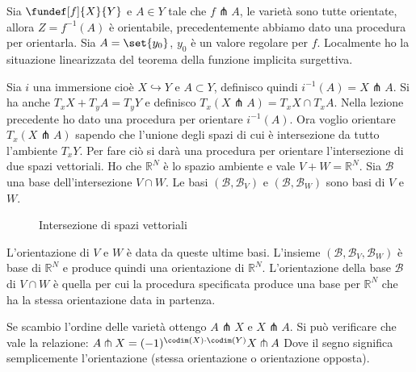 

Sia $\fundef[f]{X}{Y}$ e $A \in Y$ tale che $f \pitchfork A$, le varietà sono tutte orientate, allora $Z = f^{-1}(A)$ è orientabile, precedentemente abbiamo dato una procedura per orientarla.
Sia $A = \set{y_0}$, $y_0$ è un valore regolare per $f$. Localmente ho la situazione linearizzata del teorema della funzione implicita surgettiva.


\newcommand*\base{\mathcal B}

Sia $i$ una immersione cioè $X \hookrightarrow Y$ e $A \subset Y$, definisco quindi $i^{-1} (A) = X \pitchfork A$. Si ha anche $T_{x}X + T_{y}A = T_{y}Y$ e definisco $T_{x}(X \pitchfork A) = T_{x}X \cap T_{x}A$.
Nella lezione precedente ho dato una procedura per orientare $i^{-1} (A)$. Ora voglio orientare  $T_{x}(X \pitchfork A)$ sapendo che l'unione degli spazi di cui è intersezione da tutto l'ambiente $T_{x}Y$. Per fare ciò si darà una procedura per orientare l'intersezione di due spazi vettoriali.
Ho che $\mathbb{R}^{N}$ è lo spazio ambiente e vale $V+W = \mathbb{R}^{N}$. Sia $\base$ una base dell'intersezione $V \cap W $. Le basi $(\base, \base_{V})$ e  $(\base, \base_{W})$ sono basi di $V$ e $W$.

\begin{figure}
    \centering %
    
    \caption{Intersezione di spazi vettoriali}
\end{figure}

L'orientazione di $V$ e $W$ è data da queste ultime basi. L'insieme $(\base, \base_V, \base_W)$ è base di $\mathbb{R}^{N}$ e produce quindi una orientazione di $\mathbb{R}^{N}$.
L'orientazione della base $\base$ di $V \cap W$ è quella per cui la procedura specificata produce una base per $\mathbb{R}^{N}$ che ha la stessa orientazione data in partenza.


\begin{oss}
 Se scambio l'ordine delle varietà ottengo $A \pitchfork X$ e $X \pitchfork A$. Si può verificare che vale la relazione: $ A \pitchfork X = (-1)^{\codim(X) \cdot \codim(Y)} X \pitchfork A$
 Dove il segno significa semplicemente l'orientazione (stessa orientazione o orientazione opposta).
\end{oss}

